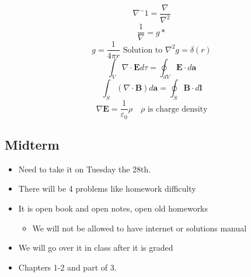 \documentclass[11pt]{article}
\begin{document}
$$\nabla^-1 = \frac{\nabla}{\nabla^2}$$
$$ \frac{1}{\nabla} = g \ast $$
$$ g = \frac{1}{4 \pi r} \text{ Solution to } \nabla^2 g = \delta(r)$$
$$\int_V \nabla \cdot \bm{E} d \tau = \oint_{dV} \bm{E} \cdot d \bm{a} $$
$$\int_S (\nabla \cdot \bm{B}) d \bm{a} = \oint_{S} \bm{B} \cdot d \bm{l} $$
$$ \nabla \bm{E} = \frac{1}{\varepsilon_0} \rho \quad \rho \text{ is charge density}$$
\subsection{Midterm}
\label{sec-2-4}

\begin{itemize}
\item Need to take it on Tuesday the 28th.
\item There will be 4 problems like homework difficulty
\item It is open book and open notes, open old homeworks
\begin{itemize}
\item We will not be allowed to have internet or solutions manual
\end{itemize}
\item We will go over it in class after it is graded
\item Chapters 1-2 and part of 3.
\end{itemize}
\end{document}
